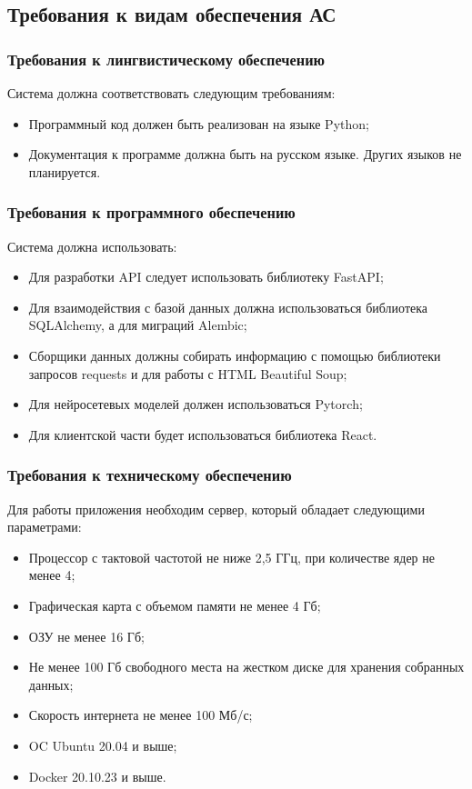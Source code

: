 {\subsection{Требования к видам обеспечения АС}
\subsubsection{Требования к лингвистическому обеспечению}
Система должна соответствовать следующим требованиям:
\begin{itemize}
  \item Программный код должен быть реализован на языке Python;
  \item Документация к программе должна быть на русском языке. Других языков не планируется.
\end{itemize}
\subsubsection{Требования к программного обеспечению}
Система должна использовать:
\begin{itemize}
  \item Для разработки API следует использовать библиотеку FastAPI;
  \item Для взаимодействия с базой данных должна использоваться библиотека SQLAlchemy, а для миграций Alembic;
  \item Сборщики данных должны собирать информацию с помощью библиотеки запросов
        requests и для работы с HTML Beautiful Soup;
  \item Для нейросетевых моделей должен использоваться Pytorch;
  \item Для клиентской части будет использоваться библиотека React.
\end{itemize}
\subsubsection{Требования к техническому обеспечению}
Для работы приложения необходим сервер, который обладает следующими параметрами:
\begin{itemize}
  \item Процессор с тактовой частотой не ниже 2,5 ГГц, при количестве ядер не менее 4;
  \item  Графическая карта с объемом памяти не менее 4 Гб;
  \item ОЗУ не менее 16 Гб;
  \item Не менее 100 Гб свободного места на жестком диске для хранения собранных
        данных;
  \item Скорость интернета не менее 100 Мб/с;
  \item OC Ubuntu 20.04 и выше;
  \item Docker 20.10.23 и выше.
\end{itemize}
}

